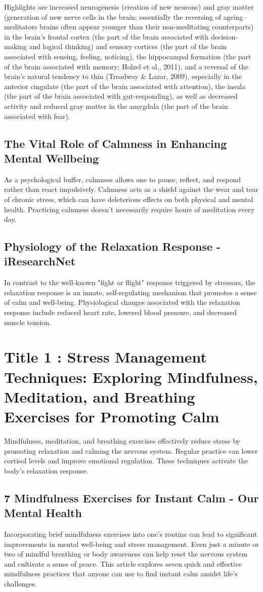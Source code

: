 \documentclass[12pt]{article}
\begin{document}
Highlights are increased neurogenesis (creation of new neurons) and gray matter (generation of new nerve cells in the brain; essentially the reversing of ageing--meditators brains often appear younger than their non-meditating counterparts) in the brain’s frontal cortex (the part of the brain associated with decision-making and logical thinking) and sensory cortices (the part of the brain associated with sensing, feeling, noticing), the hippocampal formation (the part of the brain associated with memory; Holzel et al., 2011), and a reversal of the brain’s natural tendency to thin (Treadway \& Lazar, 2009), especially in the anterior cingulate (the part of the brain associated with attention), the insula (the part of the brain associated with gut-responding), as well as decreased activity and reduced gray matter in the amygdala (the part of the brain associated with fear).\subsection{The Vital Role of Calmness in Enhancing Mental Wellbeing}
As a psychological buffer, calmness allows one to pause, reflect, and respond rather than react impulsively. Calmness acts as a shield against the wear and tear of chronic stress, which can have deleterious effects on both physical and mental health. Practicing calmness doesn't necessarily require hours of meditation every day.\subsection{Physiology of the Relaxation Response - iResearchNet}
In contrast to the well-known "fight or flight" response triggered by stressors, the relaxation response is an innate, self-regulating mechanism that promotes a sense of calm and well-being. Physiological changes associated with the relaxation response include reduced heart rate, lowered blood pressure, and decreased muscle tension.
\section{Title 1 : Stress Management Techniques: Exploring Mindfulness, Meditation, and Breathing Exercises for Promoting Calm}
Mindfulness, meditation, and breathing exercises effectively reduce stress by promoting relaxation and calming the nervous system. Regular practice can lower cortisol levels and improve emotional regulation. These techniques activate the body's relaxation response.\subsection{7 Mindfulness Exercises for Instant Calm - Our Mental Health}
Incorporating brief mindfulness exercises into one's routine can lead to significant improvements in mental well-being and stress management. Even just a minute or two of mindful breathing or body awareness can help reset the nervous system and cultivate a sense of peace. This article explores seven quick and effective mindfulness practices that anyone can use to find instant calm amidst life's challenges.
\end{document}
